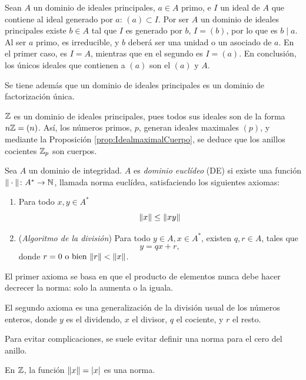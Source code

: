 \begin{prop}\end{prop}

\begin{dem}{\cite[p.~39]{GamboaAnillos}}
    Sean $A$ un dominio de ideales principales, $a\in A$ primo, e $I$ un ideal de $A$ que contiene al ideal generado por $a$: $(a) \subset I$. Por ser $A$ un dominio de ideales principales existe $b\in A$ tal que $I$ es generado por $b$, $I = (b)$, por lo que es $b\mid a$. Al ser $a$ primo, es irreducible, y $b$ deberá ser una unidad o un asociado de $a$. En el primer caso, es $I = A$, mientras que en el segundo es $I = (a)$. En conclusión, los únicos ideales que contienen a $(a)$ son el $(a)$ y $A$.
\end{dem}

Se tiene además que un dominio de ideales principales es un dominio de factorización única. \cite[p.~40]{Rosenberger}


    \begin{ejs}
        \item $\mathbb{Z}$ es un dominio de ideales principales, pues todos sus ideales son de la forma $n\mathbb{Z} = (n)$. Así, los números primos, $p$, generan ideales maximales $(p)$, y mediante la Proposición \ref{prop:IdealmaximalCuerpo}, se deduce que los anillos cocientes $\mathbb{Z}_p$ son cuerpos.
    \end{ejs}




\begin{deff}{\cite[p.~43]{Rosenberger}}
    Sea $A$ un dominio de integridad. $A$ es \textit{dominio euclídeo} (DE) si existe una función $\|\cdot\| \colon A^* \to \mathbb{N}$, llamada norma euclídea, satisfaciendo los siguientes axiomas:
    \begin{enumerate}
        \item Para todo $x,y\in A^*$ \[\|x\| \leq\|xy\|\]
        \item (\textit{Algoritmo de la división}) Para todo $y\in A, x \in A^*$, existen $q,r \in A$, tales que \[y =qx + r,\] donde $r = 0 \text{ o bien } \|r\| < \|x\|$.
    \end{enumerate}
\end{deff}

\begin{obss}
        \item El primer axioma se basa en que el producto de elementos nunca debe hacer decrecer la norma: solo la aumenta o la iguala.
        \item El segundo axioma es una generalización de la división usual de los números enteros, donde $y$ es el dividendo, $x$ el divisor, $q$ el cociente, y $r$ el resto.
        \item Para evitar complicaciones, se suele evitar definir una norma para el cero del anillo.
        \item En $\mathbb{Z}$, la función $\|x\| = |x|$ es una norma.
\end{obss}

